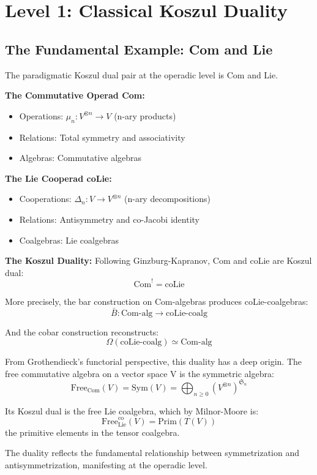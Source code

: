 \section{Level 1: Classical Koszul Duality}

\subsection{The Fundamental Example: Com and Lie}

\begin{example}\label{ex:com-lie-classical}
The paradigmatic Koszul dual pair at the operadic level is Com and Lie.

\textbf{The Commutative Operad Com:}
\begin{itemize}
\item Operations: $\mu_n: V^{\otimes n} \to V$ (n-ary products)
\item Relations: Total symmetry and associativity
\item Algebras: Commutative algebras
\end{itemize}

\textbf{The Lie Cooperad coLie:}
\begin{itemize}
\item Cooperations: $\Delta_n: V \to V^{\otimes n}$ (n-ary decompositions)
\item Relations: Antisymmetry and co-Jacobi identity
\item Coalgebras: Lie coalgebras
\end{itemize}

\textbf{The Koszul Duality:}
Following Ginzburg-Kapranov, Com and coLie are Koszul dual:
$$\text{Com}^! = \text{coLie}$$

More precisely, the bar construction on Com-algebras produces coLie-coalgebras:
$$\bar{B}: \text{Com-alg} \to \text{coLie-coalg}$$

And the cobar construction reconstructs:
$$\Omega(\text{coLie-coalg}) \simeq \text{Com-alg}$$
\end{example}

\begin{remark}\label{rem:why-com-lie}
From Grothendieck's functorial perspective, this duality has a deep origin. The free commutative algebra on a vector space V is the symmetric algebra:
$$\text{Free}_{\text{Com}}(V) = \text{Sym}(V) = \bigoplus_{n \geq 0} (V^{\otimes n})^{\mathfrak{S}_n}$$

Its Koszul dual is the free Lie coalgebra, which by Milnor-Moore is:
$$\text{Free}_{\text{Lie}}^{\text{co}}(V) = \text{Prim}(T(V))$$
the primitive elements in the tensor coalgebra.

The duality reflects the fundamental relationship between symmetrization and antisymmetrization, manifesting at the operadic level.
\end{remark}

